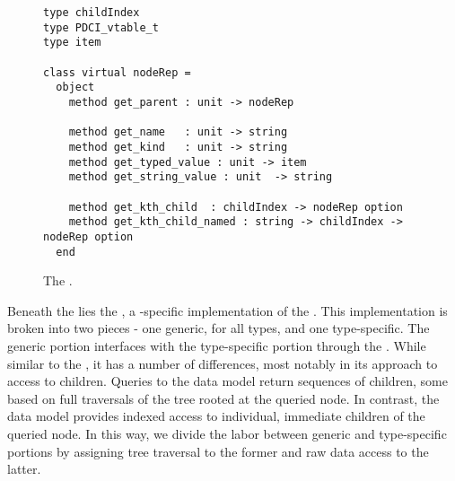 
\begin{figure*}
{\small
\begin{verbatim}
type childIndex
type PDCI_vtable_t
type item

class virtual nodeRep = 
  object 
    method get_parent : unit -> nodeRep

    method get_name   : unit -> string
    method get_kind   : unit -> string
    method get_typed_value : unit -> item
    method get_string_value : unit  -> string

    method get_kth_child  : childIndex -> nodeRep option
    method get_kth_child_named : string -> childIndex -> nodeRep option
  end
\end{verbatim}
}
\caption{The \padx{} \absdm.}
\label{fig:padx-absdm}
\end{figure*}

Beneath the \galax \absdm lies the \padx{} \condm, a \padx{}-specific
implementation of the \galax \absdm. This implementation is broken
into two pieces - one generic, for all \pads types, and one
type-specific. The generic portion interfaces with the type-specific
portion through the \padx \absdm.  While similar to the \galax{}
\absdm, it has a number of differences, most notably in its approach
to access to children.  Queries to the \galax data model return
sequences of children, some based on full traversals of the tree
rooted at the queried node. In contrast, the \padx{} data model
provides indexed access to individual, immediate children of the
queried node. In this way, we divide the labor between generic and
type-specific portions by assigning tree traversal to the former and
raw data access to the latter.


